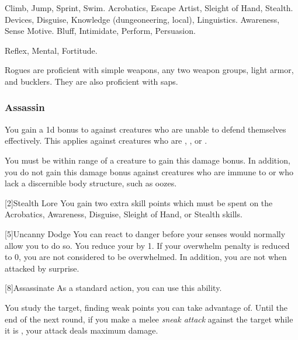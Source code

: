          Climb, Jump, Sprint, Swim.
         Acrobatics, Escape Artist, Sleight of Hand, Stealth.
         Devices, Disguise, Knowledge (dungeoneering, local), Linguistics.
         Awareness, Sense Motive.
         Bluff, Intimidate, Perform, Persuasion.

          Reflex,  Mental,  Fortitude.

        Rogues are proficient with simple weapons, any two weapon groups, light armor, and bucklers.
        They are also proficient with saps.

        \subsubsection{Assassin}
             You gain a \plus1d bonus to  against creatures who are unable to defend themselves effectively.
            This applies against creatures who are \unaware, , or .

            You must be within \rngclose range of a creature to gain this damage bonus.
            In addition, you do not gain this damage bonus against creatures who are immune to  or who lack a discernible body structure, such as oozes.

            [2]{Stealth Lore} You gain two extra skill points which must be spent on the Acrobatics, Awareness, Disguise, Sleight of Hand, or Stealth skills.

            [5]{Uncanny Dodge} You can react to danger before your senses would normally allow you to do so.
            You reduce your  by 1.
            If your overwhelm penalty is reduced to 0, you are not considered to be overwhelmed.
            In addition, you are not \unaware when attacked by surprise.

            [8]{Assassinate} As a standard action, you can use this ability.
            \begin{ability}
                \begin{spelltargetinginfo}
                \end{spelltargetinginfo}
                \begin{spelleffects}
                    \spelleffect You study the target, finding weak points you can take advantage of.
                    Until the end of the next round, if you make a melee \textit{sneak attack} against the target while it is \unaware, your attack deals maximum damage.
                \end{spelleffects}
            \end{ability}

